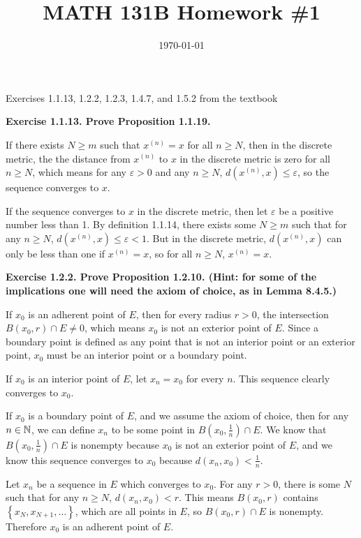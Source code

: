 \documentclass{article}
\date{\today}
\title{MATH 131B Homework \#1}
\begin{document}
\maketitle

\begin{prob}
    Exercises 1.1.13, 1.2.2, 1.2.3, 1.4.7, and 1.5.2 from the textbook
\end{prob}
\textbf{Exercise 1.1.13. Prove Proposition 1.1.19.}
\par
If there exists $N \geq m$ such that $x^{(n)}=x$ for all $n \geq N$, then in the discrete metric, the the distance from $x^{(n)}$ to $x$ in the discrete metric is zero for all $n \geq N$, which means for any $\varepsilon > 0$ and any $n \geq N$, $d(x^{(n)}, x) \leq \varepsilon$, so the sequence converges to $x$.
\par
If the sequence converges to $x$ in the discrete metric, then let $\varepsilon$ be a positive number less than 1. By definition 1.1.14, there exists some $N \geq m$ such that for any $n \geq N$, $d(x^{(n)}, x) \leq \varepsilon < 1$. But in the discrete metric, $d(x^{(n)},x)$ can only be less than one if $x^{(n)}=x$, so for all $n \geq N$, $x^{(n)}=x$.
\bigskip
\par
\textbf{Exercise 1.2.2. Prove Proposition 1.2.10. (Hint: for some of the implications one will need the axiom of choice, as in Lemma 8.4.5.)}
\par
{} If $x_0$ is an adherent point of $E$, then for every radius $r > 0$, the intersection $B(x_0, r) \cap E \neq 0$, which means $x_0$ is not an exterior point of $E$. Since a boundary point is defined as any point that is not an interior point or an exterior point, $x_0$ must be an interior point or a boundary point.
\par
{} If $x_0$ is an interior point of $E$, let $x_n=x_0$ for every $n$. This sequence clearly converges to $x_0$.
\par
If $x_0$ is a boundary point of $E$, and we assume the axiom of choice, then for any $n \in \mathbb{N}$, we can define $x_n$ to be some point in $B(x_0, \frac{1}{n}) \cap E$. We know that $B(x_0, \frac{1}{n}) \cap E$ is nonempty because $x_0$ is not an exterior point of $E$, and we know this sequence converges to $x_0$ because $d(x_n, x_0) < \frac{1}{n}$.
\par
{} Let $x_n$ be a sequence in $E$ which converges to $x_0$. For any $r > 0$, there is some $N$ such that for any $n \geq N$, $d(x_n, x_0) < r$. This means $B(x_0, r)$ contains $\left\{ x_N, x_{N+1}, \dots \right\}$, which are all points in $E$, so $B(x_0, r) \cap E$ is nonempty. Therefore $x_0$ is an adherent point of $E$.
\end{document}
